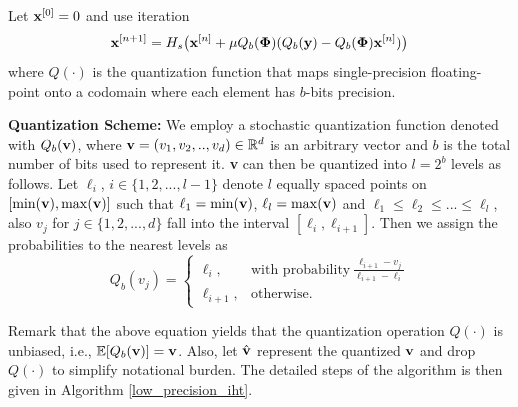 \documentclass{article}
\begin{document}
Let ${\bf x}^{[0]} = 0$ and use iteration
\begin{equation} \label{modified_update_rule}
  {\bf x}^{[n+1]} = H_s\big({\bf x}^{[n]}+\mu Q_b(\boldsymbol{\Phi})(Q_b({\bf y})-Q_b(\boldsymbol{\Phi}){\bf x}^{[n]})\big)  
\end{equation}
where $Q(\cdot)$ is the quantization function that maps single-precision floating-point onto a codomain where each element has $b$-bits precision.

{\bf Quantization Scheme:} We employ a stochastic quantization function denoted with $Q_b({\bf v})$, where ${\bf v}=(v_1, v_2, .., v_d) \in \mathbb{R}^d$ is an arbitrary vector and $b$ is the total number of bits used to represent it. {\bf v} can then be quantized into $l=2^b$ levels as follows. Let $\ell_i$, $i\in \{1, 2, ..., l-1 \}$ denote $l$ equally spaced points on $[\min({\bf v}), \max({\bf v})]$ such that $\ell_1=\min({\bf v})$, $\ell_l=\max({\bf v})$ and $\ell_1\leq\ell_2 \leq ... \leq \ell_l$, also $v_j$ for $j\in \{1, 2, ..., d \}$ fall into the interval $[\ell_i, \ell_{i+1}]$. Then we assign the probabilities to the nearest levels as
\[
    Q_b(v_j) = \left\{\begin{array}{lr}
        \ell_i, & \textrm{with probability} \ \frac{\ell_{i+1}-v_j}{\ell_{i+1}-\ell_i}\\
        \ell_{i+1},&\textrm{otherwise}.  \ \ \ \  \ \ \ \ \ \ \ \ \ \ \ \ \ \ 
        \end{array}
\]
  
Remark that the above equation yields that the quantization operation $Q(\cdot)$ is unbiased, i.e., $\mathbb{E}[Q_b({\bf v})] = {\bf v}$. Also, let $\hat{{\bf v}}$ represent the quantized ${\bf v}$ and drop $Q(\cdot)$ to simplify notational burden. The detailed steps of the algorithm is then given in Algorithm \ref{low_precision_iht}.
\end{document}
